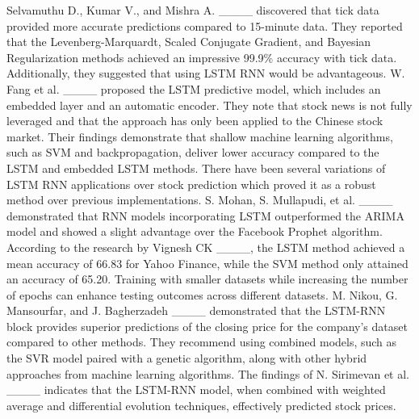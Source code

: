 Selvamuthu D., Kumar V., and Mishra A. ____ discovered that tick data provided more accurate predictions compared to 15-minute data. They reported that the Levenberg-Marquardt, Scaled Conjugate Gradient, and Bayesian Regularization methods achieved an impressive 99.9\% accuracy with tick data. Additionally, they suggested that using LSTM RNN would be advantageous. W. Fang et al. ____ proposed the LSTM predictive model, which includes an embedded layer and an automatic encoder. They note that stock news is not fully leveraged and that the approach has only been applied to the Chinese stock market. Their findings demonstrate that shallow machine learning algorithms, such as SVM and backpropagation, deliver lower accuracy compared to the LSTM and embedded LSTM methods. There have been several variations of LSTM RNN applications over stock prediction which proved it as a robust method over previous implementations. S. Mohan, S. Mullapudi, et al. ____ demonstrated that RNN models incorporating LSTM outperformed the ARIMA model and showed a slight advantage over the Facebook Prophet algorithm. According to the research by Vignesh CK ____, the LSTM method achieved a mean accuracy of 66.83 for Yahoo Finance, while the SVM method only attained an accuracy of 65.20. Training with smaller datasets while increasing the number of epochs can enhance testing outcomes across different datasets. M. Nikou, G. Mansourfar, and J. Bagherzadeh ____ demonstrated that the LSTM-RNN block provides superior predictions of the closing price for the company's dataset compared to other methods. They recommend using combined models, such as the SVR model paired with a genetic algorithm, along with other hybrid approaches from machine learning algorithms. The findings of N. Sirimevan et al. ____ indicates that the LSTM-RNN model, when combined with weighted average and differential evolution techniques, effectively predicted stock prices. 

